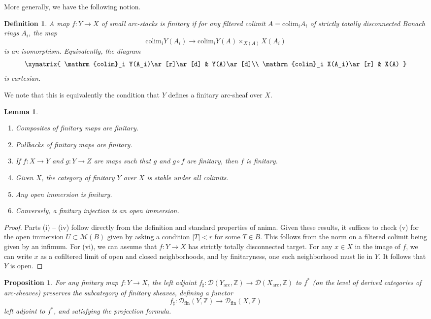 \documentclass[11pt]{amsart}
\numberwithin{equation}{section}
\numberwithin{theorem}{section}
\newtheorem{lemma}[theorem]{Lemma}
\newtheorem{proposition}[theorem]{Proposition}
\newtheorem{definition}[theorem]{Definition}
\theoremstyle{definition}
\begin{document}
More generally, we have the following notion.

\begin{definition} A map $f: Y\to X$ of small arc-stacks is finitary if for any filtered colimit $A=\mathrm{colim}_i A_i$ of strictly totally disconnected Banach rings $A_i$, the map
\[
\mathrm{colim}_i Y(A_i)\to \mathrm{colim}_i Y(A)\times_{X(A)} X(A_i)
\]
is an isomorphism. Equivalently, the diagram
\[\xymatrix{
\mathrm{colim}_i Y(A_i)\ar[r]\ar[d] & Y(A)\ar[d]\\
\mathrm{colim}_i X(A_i)\ar[r] & X(A)
}\]
is cartesian.
\end{definition}

We note that this is equivalently the condition that $Y$ defines a finitary arc-sheaf over $X$.

\begin{lemma}\leavevmode
\begin{enumerate} 
\item[{\rm (i)}] Composites of finitary maps are finitary.
\item[{\rm (ii)}] Pullbacks of finitary maps are finitary.
\item[{\rm (iii)}] If $f: X\to Y$ and $g: Y\to Z$ are maps such that $g$ and $g\circ f$ are finitary, then $f$ is finitary.
\item[{\rm (iv)}] Given $X$, the category of finitary $Y$ over $X$ is stable under all colimits.
\item[{\rm (v)}] Any open immersion is finitary.
\item[{\rm (vi)}] Conversely, a finitary injection is an open immersion.
\end{enumerate}
\end{lemma}

\begin{proof} Parts (i) -- (iv) follow directly from the definition and standard properties of anima. Given these results, it suffices to check (v) for the open immersion $U\subset \mathcal M(B)$ given by asking a condition $|T|<r$ for some $T\in B$. This follows from the norm on a filtered colimit being given by an infimum. For (vi), we can assume that $f: Y\to X$ has strictly totally disconnected target. For any $x\in X$ in the image of $f$, we can write $x$ as a cofiltered limit of open and closed neighborhoods, and by finitaryness, one such neighborhood must lie in $Y$. It follows that $Y$ is open.
\end{proof}

\begin{proposition}\label{prop:finitaryleftadjoint} For any finitary map $f: Y\to X$, the left adjoint $f_\sharp: \mathcal D(Y_{\mathrm{arc}},\mathbb Z)\to \mathcal D(X_{\mathrm{arc}},\mathbb Z)$ to $f^\ast$ (on the level of derived categories of arc-sheaves) preserves the subcategory of finitary sheaves, defining a functor
\[
f_\sharp: \mathcal D_{\mathrm{fin}}(Y,\mathbb Z)\to \mathcal D_{\mathrm{fin}}(X,\mathbb Z)
\]
left adjoint to $f^\ast$, and satisfying the projection formula.
\end{proposition}
\end{document}

